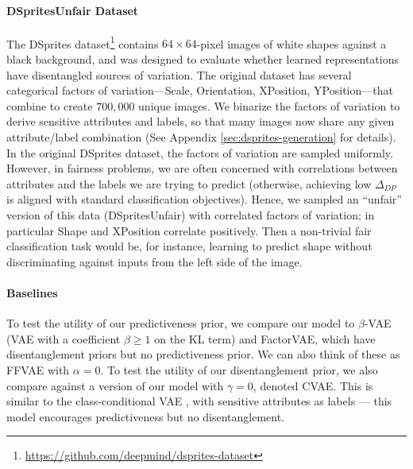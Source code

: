 \paragraph{DSpritesUnfair Dataset}

The DSprites dataset\footnote{\scriptsize \url{https://github.com/deepmind/dsprites-dataset}} contains $64 \times 64$-pixel images of white shapes against a black background, and was designed to evaluate whether learned representations have disentangled sources of variation.
The original dataset has several categorical factors of variation---Scale, Orientation, XPosition, YPosition---that combine to create $700,000$ unique images.
We binarize the factors of variation to derive sensitive attributes and labels, so that many images now share any given attribute/label combination (See Appendix \ref{sec:dsprites-generation} for details).
In the original DSprites dataset, the factors of variation are sampled uniformly.
However, in fairness problems, we are often concerned with correlations between attributes and the labels we are trying to predict (otherwise, achieving low $\Delta_{DP}$ is aligned with standard classification objectives).
Hence, we sampled an ``unfair'' version of this data (DSpritesUnfair) with correlated factors of variation; in particular Shape and XPosition correlate positively.
Then a non-trivial fair classification task would be, for instance, learning to predict shape without discriminating against inputs from the left side of the image.

\paragraph{Baselines}
To test the utility of our predictiveness prior, we compare our model to $\beta$-VAE (VAE with a coefficient $\beta \geq 1$ on the KL term) and FactorVAE, which have disentanglement priors but no predictiveness prior.
We can also think of these as FFVAE with $\alpha = 0$.
To test the utility of our disentanglement prior, we also compare against a version of our model with $\gamma = 0$, denoted CVAE.
This is similar to the class-conditional VAE \citep{kingma2014semi}, with sensitive attributes as labels --- this model encourages predictiveness but no disentanglement.


